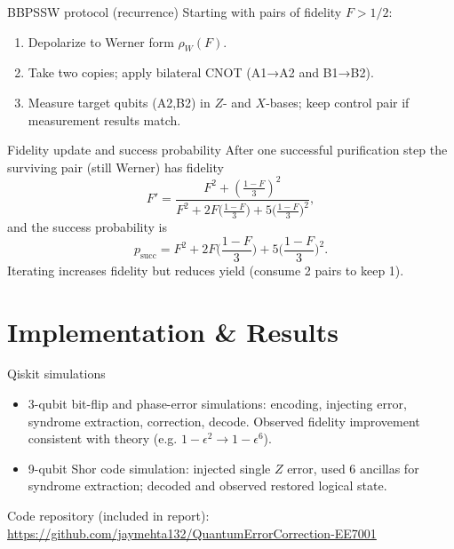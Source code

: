 \documentclass[10pt]{beamer}
\begin{document}
\begin{frame}{BBPSSW protocol (recurrence)}
  Starting with pairs of fidelity \(F>1/2\):
  \begin{enumerate}
    \item Depolarize to Werner form \(\rho_W(F)\).
    \item Take two copies; apply bilateral CNOT (A1→A2 and B1→B2).
    \item Measure target qubits (A2,B2) in \(Z\)- and \(X\)-bases; keep control pair if measurement results match.
  \end{enumerate}
\end{frame}

\begin{frame}{Fidelity update and success probability}
  After one successful purification step the surviving pair (still Werner) has fidelity
  \[
    F'=\frac{F^2 + \left(\tfrac{1-F}{3}\right)^2}{F^2 + 2F\big(\tfrac{1-F}{3}\big) + 5\big(\tfrac{1-F}{3}\big)^2},
  \]
  and the success probability is
  \[
    p_{\text{succ}} = F^2 + 2F\Big(\frac{1-F}{3}\Big) + 5\Big(\frac{1-F}{3}\Big)^2.
  \]
  Iterating increases fidelity but reduces yield (consume 2 pairs to keep 1).
\end{frame}

\section{Implementation \& Results}
\begin{frame}{Qiskit simulations}
  \begin{itemize}
    \item 3-qubit bit-flip and phase-error simulations: encoding, injecting error, syndrome extraction, correction, decode. Observed fidelity improvement consistent with theory (e.g. \(1-\epsilon^2 \to 1-\epsilon^6\)).
    \item 9-qubit Shor code simulation: injected single \(Z\) error, used 6 ancillas for syndrome extraction; decoded and observed restored logical state.
  \end{itemize}
  Code repository (included in report): \\
  \small \url{https://github.com/jaymehta132/QuantumErrorCorrection-EE7001}
\end{frame}

  
\end{document}

